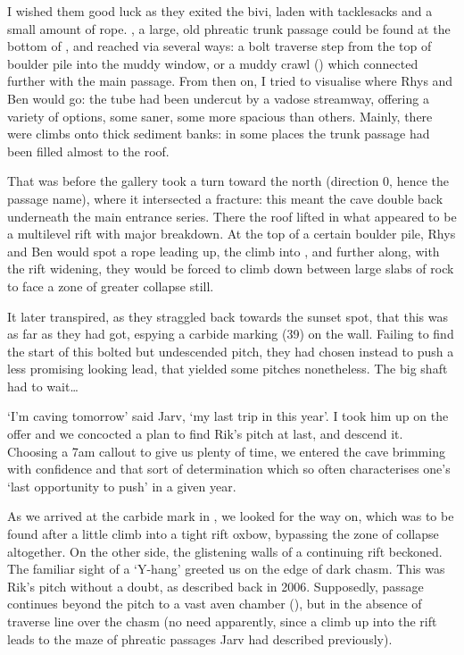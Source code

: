 I wished them good luck as they exited the bivi, laden with tacklesacks and a small amount of rope. , a large, old phreatic trunk passage could be found at the bottom of , and reached via several ways: a bolt traverse step from the top of boulder pile into the muddy window, or a muddy crawl () which connected further with the main passage. From then on, I tried to visualise where Rhys and Ben would go: the tube had been undercut by a vadose streamway, offering a variety of options, some saner, some more spacious than others. Mainly, there were climbs onto thick sediment banks: in some places the trunk passage had been filled almost to the roof. 

That was before the gallery took a turn toward the north (direction 0, hence the passage name), where it intersected a fracture: this meant the cave double back underneath the main  entrance series. There the roof lifted in what appeared to be a multilevel rift with major breakdown. At the top of a certain boulder pile, Rhys and Ben would spot a rope leading up, the climb into , and further along, with the rift widening, they would be forced to climb down between large slabs of rock to face a zone of greater collapse still. 

It later transpired, as they straggled back towards the sunset spot, that this was as far as they had got, espying a carbide marking (39) on the wall. Failing to find the start of this bolted but undescended pitch, they had chosen instead to push a less promising looking lead, that yielded some pitches nonetheless. The big shaft had to wait…

‘I’m caving tomorrow’ said Jarv, ‘my last trip in  this year’. I took him up on the offer and we concocted a plan to find Rik’s pitch at last, and descend it. Choosing a 7am callout to give us plenty of time, we entered the cave brimming with confidence and that sort of determination which so often characterises one’s ‘last opportunity to push’ in a given year. 

As we arrived at the carbide mark in , we looked for the way on, which was to be found after a little climb into a tight rift oxbow, bypassing the zone of collapse altogether. On the other side, the glistening walls of a continuing rift beckoned. The familiar sight of a ‘Y-hang’ greeted us on the edge of dark chasm. This was Rik’s pitch without a doubt, as described back in 2006. Supposedly,  passage continues beyond the pitch to a vast aven chamber (), but in the absence of traverse line over the chasm (no need apparently, since a climb up into the rift leads to the maze of phreatic passages Jarv had described previously).


